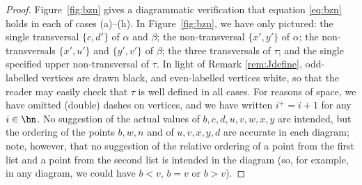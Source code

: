 \begin{proof}
Figure~\ref{fig:bzn} gives a diagrammatic verification that equation \eqref{eq:bzn} holds in each of cases (a)--(h).  In Figure~\ref{fig:bzn}, we have only pictured: the single transversal $\{c,d'\}$ of $\alpha$ and $\beta$; the non-transversal $\{x',y'\}$ of $\alpha$; the non-transversals $\{x',u'\}$ and $\{y',v'\}$ of $\beta$; the three transversals of $\tau$; and the single specified upper non-transversal of $\tau$.  In light of Remark \ref{rem:Jdefine}, odd-labelled vertices are drawn black, and even-labelled vertices white, so that the reader may easily check that $\tau$ is well defined in all cases.  For reasons of space, we have omitted (double) dashes on vertices, and we have written $i^+=i+1$ for any~$i\in\bn$.  No suggestion of the actual values of $b,c,d,u,v,w,x,y$ are intended, but the ordering of the points $b,w,n$ and of $u,v,x,y,d$ are accurate in each diagram; note, however, that no suggestion of the relative ordering of a point from the first list and a point from the second list is intended in the diagram (so, for example, in any diagram, we could have $b<v$, $b=v$ or $b>v$).



\end{proof}

